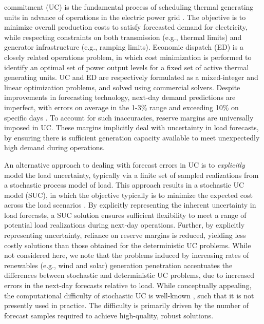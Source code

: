 \documentclass[conference]{IEEEtran}
\begin{document}
 commitment (UC) is the fundamental process of
scheduling thermal generating units in advance of operations in the
electric power grid \cite{carrionarroyo06}. The objective is to
minimize overall production costs to satisfy forecasted demand for
electricity, while respecting constraints on both transmission (e.g.,
thermal limits) and generator infrastructure (e.g., ramping
limits). Economic dispatch (ED) is a closely related 
operations problem, in which cost minimization is performed to
identify an optimal set of power output levels for a fixed set of
active thermal generating units. UC and ED are respectively formulated
as a mixed-integer and linear optimization problems, and solved using
commercial solvers. Despite improvements in forecasting technology,
next-day demand predictions are imperfect, with errors on average in
the 1-3\% range and exceeding 10\% on specific days \cite{is one}.
To account for such inaccuracies, reserve margins are universally
imposed in UC. These margins implicitly deal with uncertainty in load
forecasts, by ensuring there is sufficient generation capacity
available to meet unexpectedly high demand during operations. 

An alternative approach to dealing with forecast errors in UC is to
\emph{explicitly} model the load uncertainty, typically via a finite
set of sampled realizations from a stochastic process model of
load. This approach results in a stochastic UC model (SUC), in which
the objective typically is to minimize the expected cost across the
load scenarios \cite{ruizetal09,takritietal96}. By explicitly
representing the inherent uncertainty in load forecasts, a SUC
solution ensures sufficient flexibility to meet a range of potential
load realizations during next-day operations. Further, by explicitly
representing uncertainty, reliance on reserve margins is reduced,
yielding less costly solutions than those obtained for the
deterministic UC problems. While not considered here, we note that the
problems induced by increasing rates of renewables (e.g., wind and
solar) generation penetration accentuates the differences between
stochastic and deterministic UC problems, due to
increased errors in the next-day forecasts relative to load. While
conceptually appealing, the computational difficulty of stochastic UC
is well-known \cite{papavasiliou11}, such that it is not presently
used in practice. The difficulty is primarily driven by the number of
forecast samples required to achieve high-quality, robust solutions. 
\end{document}
